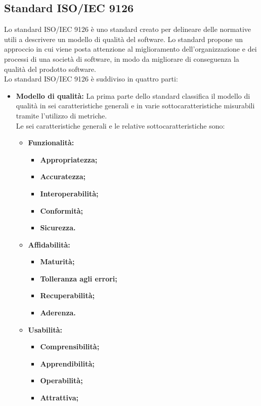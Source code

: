   	\subsection{Standard ISO/IEC 9126}
  	Lo standard ISO/IEC 9126 è uno standard creato per delineare delle normative utili a descrivere un modello di qualità del software. Lo standard propone un approccio in cui viene posta attenzione al miglioramento dell'organizzazione e dei processi di una società di software, in modo da migliorare di conseguenza la qualità del prodotto software.\\
  	Lo standard ISO/IEC 9126 è suddiviso in quattro parti:
		\begin{itemize}
			\item \textbf{Modello di qualità: } \textnormal{La prima parte dello standard classifica il modello di qualità in sei caratteristiche generali e in varie sottocaratteristiche misurabili tramite l'utilizzo di metriche.\\
			Le sei caratteristiche generali e le relative sottocaratteristiche sono:}
				\begin{itemize}
					\item \textbf{Funzionalità:}
						\begin{itemize}
							\item \textbf{Appropriatezza;}
							\item \textbf{Accuratezza;}
							\item \textbf{Interoperabilità;}
							\item \textbf{Conformità;}
							\item \textbf{Sicurezza.}
						\end{itemize}
					\item \textbf{Affidabilità:}
						\begin{itemize}
							\item \textbf{Maturità;}
							\item \textbf{Tolleranza agli errori;}
							\item \textbf{Recuperabilità;}
							\item \textbf{Aderenza.}
						\end{itemize}
					\item \textbf{Usabilità:}
						\begin{itemize}
							\item \textbf{Comprensibilità;}
							\item \textbf{Apprendibilità;}
							\item \textbf{Operabilità;}
							\item \textbf{Attrattiva;}

\end{itemize}
\end{itemize}
\end{itemize}
